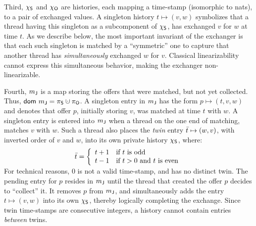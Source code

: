 Third, $\chi_{\mathsf{S}}$ and $\chi_{\mathsf{O}}$ are histories, each mapping a time-stamp
(isomorphic to nats), to a pair of exchanged values. A singleton
history $t \mapsto (v, w)$ symbolizes that a thread having this
singleton as a subcomponent of $\chi_{\mathsf{S}}$, has exchanged $v$ for $w$ at
time $t$.
%
%
As we describe below, the most important invariant of the exchanger is
that each such singleton is matched by a ``symmetric'' one to capture
that another thread has \emph{simultaneously} exchanged $w$ for
$v$. Classical linearizability cannot express this simultaneous
behavior, making the exchanger non-linearizable.

Fourth, ${m_{\mathsf{J}}}$ is a map storing the offers that were matched, but
not yet collected. Thus, $\mathsf{dom}\ \pending = \perms \hunion
\permo$. A singleton entry in ${m_{\mathsf{J}}}$ has the form $p \mapsto (t,
v, w)$ and denotes that offer $p$, initially storing $v$, was matched
at time $t$ with $w$. A singleton entry is entered into ${m_{\mathsf{J}}}$
when a thread on the one end of matching, matches $v$ with $w$. Such a
thread also places the \emph{twin} entry $\bar{t} \mapsto (w, v)$,
with inverted order of $v$ and $w$, into its own private history
$\chi_{\mathsf{S}}$, where:
%
\vspace{-5pt}
\[
\begin{array}{c}
\vspace{-5pt}
\twin{t} = \left\{%
\begin{array}{ll}
t+1 & \mbox{if $t$ is odd}\\
t-1 & \mbox{if $t > 0$ and $t$ is even}
\end{array}\right.  
\end{array}
\]
%
For technical reasons, $0$ is not a valid time-stamp, and has no
distinct twin. The pending entry for $p$ resides in ${m_{\mathsf{J}}}$ until
the thread that created the offer $p$ decides to ``collect'' it. It
removes $p$ from ${m_{\mathsf{J}}}$, and simultaneously adds the entry $t
\mapsto (v, w)$ into its own $\chi_{\mathsf{S}}$, thereby logically completing
the exchange. Since twin time-stamps are consecutive integers, a
history cannot contain entries \emph{between} twins.

